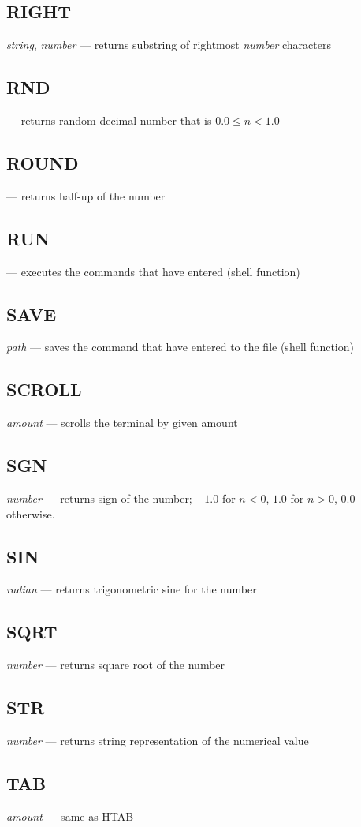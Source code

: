 \subsection{RIGHT} \emph{string}, \emph{number} --- returns substring of rightmost \emph{number} characters
\subsection{RND} --- returns random decimal number that is $ 0.0 \leq n < 1.0 $
\subsection{ROUND} --- returns half-up of the number
\subsection{RUN} --- executes the commands that have entered (shell function)
\subsection{SAVE} \emph{path} --- saves the command that have entered to the file (shell function)
\subsection{SCROLL} \emph{amount} --- scrolls the terminal by given amount
\subsection{SGN} \emph{number} --- returns sign of the number; $ -1.0 $ for $ n < 0 $, $ 1.0 $ for $ n > 0 $, $ 0.0 $ otherwise.
\subsection{SIN} \emph{radian} --- returns trigonometric sine for the number
\subsection{SQRT} \emph{number} --- returns square root of the number
\subsection{STR} \emph{number} --- returns string representation of the numerical value
\subsection{TAB} \emph{amount} --- same as HTAB
